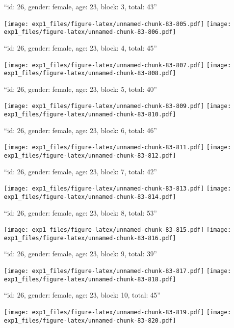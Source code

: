\documentclass[11pt,,]{article}
\begin{document}
\newpage
[1] 

``id: 26, gender: female, age: 23, block: 3, total: 43''

\texttt{[image: exp1\_files/figure-latex/unnamed-chunk-83-805.pdf]}
\texttt{[image: exp1\_files/figure-latex/unnamed-chunk-83-806.pdf]}

\newpage
[1] 

``id: 26, gender: female, age: 23, block: 4, total: 45''

\texttt{[image: exp1\_files/figure-latex/unnamed-chunk-83-807.pdf]}
\texttt{[image: exp1\_files/figure-latex/unnamed-chunk-83-808.pdf]}

\newpage
[1] 

``id: 26, gender: female, age: 23, block: 5, total: 40''

\texttt{[image: exp1\_files/figure-latex/unnamed-chunk-83-809.pdf]}
\texttt{[image: exp1\_files/figure-latex/unnamed-chunk-83-810.pdf]}

\newpage
[1] 

``id: 26, gender: female, age: 23, block: 6, total: 46''

\texttt{[image: exp1\_files/figure-latex/unnamed-chunk-83-811.pdf]}
\texttt{[image: exp1\_files/figure-latex/unnamed-chunk-83-812.pdf]}

\newpage
[1] 

``id: 26, gender: female, age: 23, block: 7, total: 42''

\texttt{[image: exp1\_files/figure-latex/unnamed-chunk-83-813.pdf]}
\texttt{[image: exp1\_files/figure-latex/unnamed-chunk-83-814.pdf]}

\newpage
[1] 

``id: 26, gender: female, age: 23, block: 8, total: 53''

\texttt{[image: exp1\_files/figure-latex/unnamed-chunk-83-815.pdf]}
\texttt{[image: exp1\_files/figure-latex/unnamed-chunk-83-816.pdf]}

\newpage
[1] 

``id: 26, gender: female, age: 23, block: 9, total: 39''

\texttt{[image: exp1\_files/figure-latex/unnamed-chunk-83-817.pdf]}
\texttt{[image: exp1\_files/figure-latex/unnamed-chunk-83-818.pdf]}

\newpage
[1] 

``id: 26, gender: female, age: 23, block: 10, total: 45''

\texttt{[image: exp1\_files/figure-latex/unnamed-chunk-83-819.pdf]}
\texttt{[image: exp1\_files/figure-latex/unnamed-chunk-83-820.pdf]}
\end{document}
